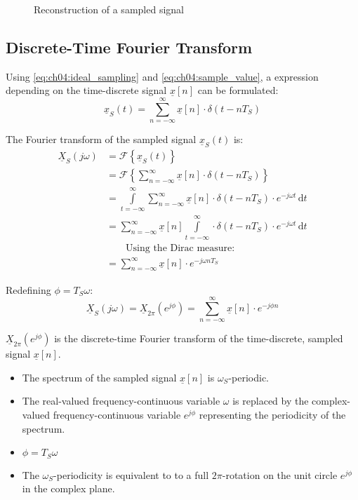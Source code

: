 \begin{refsection}
\begin{figure}[H]
	\caption{Reconstruction of a sampled signal}
\end{figure}

\subsection{Discrete-Time Fourier Transform}

Using \eqref{eq:ch04:ideal_sampling} and \eqref{eq:ch04:sample_value}, a expression depending on the time-discrete signal $\underline{x}[n]$ can be formulated:
\begin{equation}
	\underline{x}_S(t) = \sum\limits_{n = -\infty}^{\infty} \underline{x}[n] \cdot \delta(t - n T_S)
\end{equation}

The Fourier transform of the sampled signal $\underline{x}_S(t)$ is:
\begin{equation}
	\begin{split}
		\underline{X}_S \left(j \omega\right) &= \mathcal{F} \left\{\underline{x}_S(t)\right\} \\
		 &= \mathcal{F} \left\{\sum\limits_{n = -\infty}^{\infty} \underline{x}[n] \cdot \delta(t - n T_S)\right\} \\
		 &= \int\limits_{t = -\infty}^{\infty} \sum\limits_{n = -\infty}^{\infty} \underline{x}[n] \cdot \delta(t - n T_S) \cdot e^{-j \omega t} \, \mathrm{d} t \\
		 &= \sum\limits_{n = -\infty}^{\infty} \underline{x}[n] \int\limits_{t = -\infty}^{\infty} \cdot \delta(t - n T_S) \cdot e^{-j \omega t} \, \mathrm{d} t \\
		 &\qquad \text{Using the Dirac measure:} \\
		 &= \sum\limits_{n = -\infty}^{\infty} \underline{x}[n] \cdot e^{-j \omega n T_S}
	\end{split}
\end{equation}

Redefining $\phi = T_S \omega$:
\begin{equation}
	\underline{X}_S \left(j \omega\right) = \underline{X}_{2 \pi} \left(e^{j \phi}\right) = \sum\limits_{n = -\infty}^{\infty} \underline{x}[n] \cdot e^{-j \phi n}
\end{equation}

$\underline{X}_{2 \pi} \left(e^{j \phi}\right)$ is the discrete-time Fourier transform of the time-discrete, sampled signal $\underline{x}[n]$.
\begin{itemize}
	\item The spectrum of the sampled signal $\underline{x}[n]$ is $\omega_S$-periodic.
	\item The real-valued frequency-continuous variable $\omega$ is replaced by the complex-valued frequency-continuous variable $e^{j \phi}$ representing the periodicity of the spectrum.
	\item $\phi = T_S \omega$
	\item The $\omega_S$-periodicity is equivalent to to a full $2\pi$-rotation on the unit circle $e^{j \phi}$ in the complex plane.
\end{itemize}


\end{refsection}
